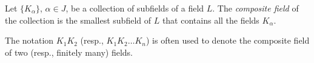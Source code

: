 \documentclass[12pt]{article}
\begin{document}
Let $\{K_\alpha\}$, $\alpha \in J$, be a collection of subfields of a field $L$. The {\em composite field} of the collection is the smallest subfield of $L$ that contains all the fields $K_\alpha$.

The notation $K_1 K_2$ (resp., $K_1 K_2 \dots K_n$) is often used to denote the composite field of two (resp., finitely many) fields.
\end{document}
